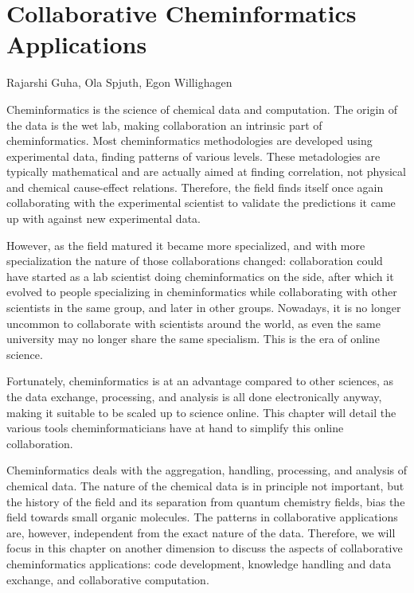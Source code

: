 \documentclass[11pt]{book}
\begin{document}
\chapter{Collaborative Cheminformatics Applications}

\begin{LARGE}
Rajarshi Guha, Ola Spjuth, Egon Willighagen
\end{LARGE}
\vspace{1.5cm}

Cheminformatics is the science of chemical data and computation.  The
origin of the data is the wet lab, making collaboration an intrinsic
part of cheminformatics. Most cheminformatics methodologies are
developed using experimental data, finding patterns of various
levels. These metadologies are typically mathematical and are
actually aimed at finding correlation, not physical and chemical
cause-effect relations. Therefore, the field finds itself once
again collaborating with the experimental scientist to validate
the predictions it came up with against new experimental data.

However, as the field matured it became more specialized,
and with more specialization the nature of those collaborations
changed: collaboration could have started as a lab scientist doing
cheminformatics on the side, after which it evolved to people
specializing in cheminformatics while collaborating with other
scientists in the same group, and later in other groups. Nowadays, it
is no longer uncommon to collaborate with scientists around the world,
as even the same university may no longer share the same
specialism. This is the era of online science.

Fortunately, cheminformatics is at an advantage compared to
other sciences, as the data exchange, processing, and analysis
is all done electronically anyway, making it suitable to be
scaled up to science online. This chapter will detail the
various tools cheminformaticians have at hand to simplify
this online collaboration.

Cheminformatics deals with the aggregation, handling, processing, and
analysis of chemical data. The nature of the chemical data is in principle
not important, but the history of the field and its separation from
quantum chemistry fields, bias the field towards small organic molecules.
The patterns in collaborative applications are, however, independent from
the exact nature of the data. Therefore, we will focus in this chapter
on another dimension to discuss the aspects of collaborative
cheminformatics applications: code development, knowledge handling
and data exchange, and collaborative computation.
\end{document}
